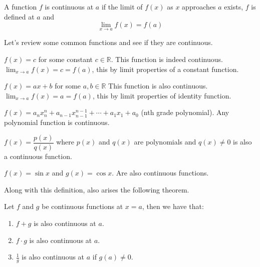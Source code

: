 \documentclass{report}
\begin{document}
\begin{defBox}
    A function $f$ is continuous at $a$ if the limit of $f(x)$ as $x$ approaches $a$ exists, $f$ is defined at $a$ and $$\lim_{x \to a}f(x) = f(a)$$
\end{defBox}

Let's review some common functions and see if they are continuous.

\begin{Example}
    $f(x) = c$ for some constant $c \in \mathbb{R}$. This function is indeed continuous. $\lim_{x \to a}f(x) = c = f(a)$, this by limit properties of a constant function.
\end{Example}

\begin{Example}
    $f(x) = ax+b$ for some $a, b \in \mathbb{R}$ This function is also continuous. $\lim_{x \to a}f(x) = a = f(a)$, this by limit properties of identity function.
\end{Example}

\begin{Example}
    $f(x) = a_nx^n_n + a_{n-1}x^{n-1}_{n-1}+\cdots + a_1x_1 + a_0$ (nth grade polynomial). Any polynomial function is continuous.
\end{Example}

\begin{Example}
    $f(x) = \dfrac{p(x)}{q(x)}$ where $p(x)$ and $q(x)$ are polynomials and $q(x) \not = 0$ is also a continuous function.
\end{Example}

\begin{Example}
    $f(x) = \sin x$ and $g(x) = \cos x$. Are also continuous functions.
\end{Example}

Along with this definition, also arises the following theorem.\\

\begin{thBox}
    Let $f$ and $g$ be continuous functions at $x=a$, then we have that:

    \begin{enumerate}
        \item $f+g$ is also continuous at $a$.
        \item $f\cdot g$ is also continuous at $a$.
        \item $\frac{1}{g}$ is also continuous at $a$ if $g(a) \not = 0$.
    \end{enumerate}
\end{thBox}
\end{document}
